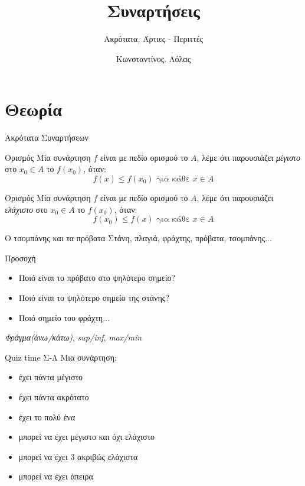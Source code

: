 \documentclass{presentation}
\title{Συναρτήσεις}
\subtitle{Ακρότατα, Άρτιες - Περιττές}
\author[Λόλας]{Κωνσταντίνος. Λόλας}
\date{}
\begin{document}
\begin{frame}
  \titlepage
\end{frame}

\section{Θεωρία}
\begin{frame}{Ακρότατα Συναρτήσεων}
  \begin{block}{Ορισμός}
    Μία συνάρτηση $f$ είναι με πεδίο ορισμού το $Α$, λέμε ότι παρουσιάζει \emph{μέγιστο} στο $x_0\in Α$ το $f(x_0)$, όταν:
    $$f(x)\le f(x_0)\text{ για κάθε } x\in Α$$
  \end{block} \pause
  \begin{block}{Ορισμός}
    Μία συνάρτηση $f$ είναι με πεδίο ορισμού το $Α$, λέμε ότι παρουσιάζει \emph{ελάχιστο} στο $x_0\in Α$ το $f(x_0)$, όταν:
    $$f(x_0)\le f(x)\text{ για κάθε } x\in Α$$
  \end{block}
\end{frame}

\begin{frame}{Ο τσομπάνης και τα πρόβατα}
  Στάνη, πλαγιά, φράχτης, πρόβατα, τσομπάνης... \pause
  \begin{alertblock}{Προσοχή}
    \begin{itemize}
      \item Ποιό είναι το πρόβατο στο ψηλότερο σημείο?
      \item Ποιό είναι το ψηλότερο σημείο της στάνης?
      \item Ποιό σημείο του φράχτη...
    \end{itemize}
  \end{alertblock}
  \emph{Φράγμα(άνω/κάτω)}, \emph{sup/inf}, \emph{max/min}
\end{frame}

\begin{frame}{Quiz time Σ-Λ}
  Μια συνάρτηση:
  \begin{itemize}
    \item έχει πάντα μέγιστο\pause
    \item έχει πάντα ακρότατο\pause
    \item έχει το πολύ ένα \pause
    \item μπορεί να έχει μέγιστο και όχι ελάχιστο \pause
    \item μπορεί να έχει 3 ακριβώς ελάχιστα \pause
    \item μπορεί να έχει άπειρα
  \end{itemize}
\end{frame}
\end{document}
